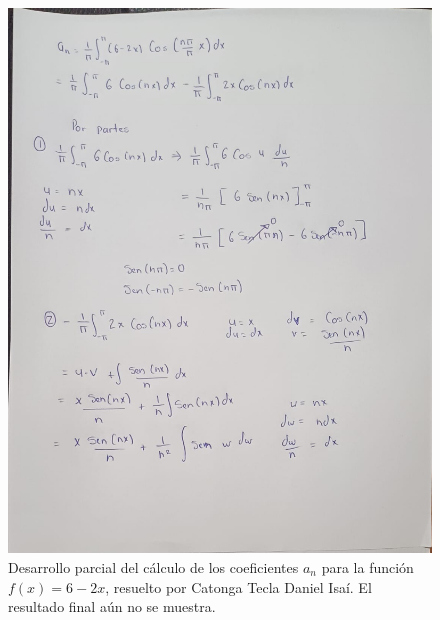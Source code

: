 {\begin{figure}[H]
    \centering
    \includegraphics[width=\linewidth]{Figures/fourierDaniel/fourierDaniel2.jpg}
    \caption[Cálculo parcial de \(a_n\) para \(f(x) = 6 - 2x\)]{Desarrollo parcial del cálculo de los coeficientes \(a_n\) para la función \(f(x) = 6 - 2x\), resuelto por Catonga Tecla Daniel Isaí. El resultado final aún no se muestra.}
    \label{fig:figure-daniel-02}
\end{figure}

}
